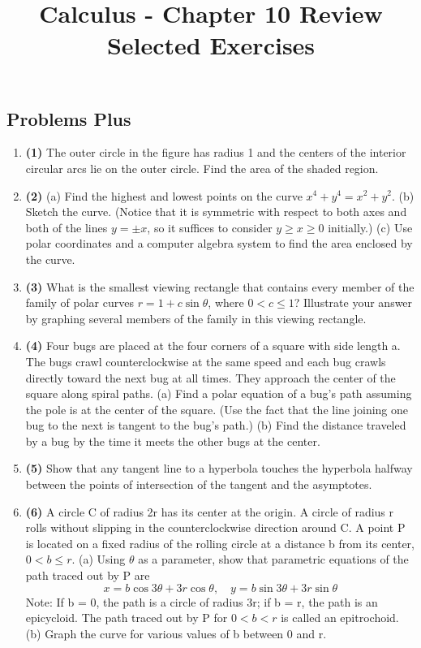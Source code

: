 \documentclass[12pt, a4paper]{article}
\title{Calculus - Chapter 10 Review Selected Exercises}
\author{}
\date{}
\begin{document}
\maketitle
\hrulefill
\vspace{1em}

\subsection*{Problems Plus}
\begin{enumerate}
    \item \textbf{(1)} The outer circle in the figure has radius 1 and the centers of the interior circular arcs lie on the outer circle. Find the area of the shaded region.
    
    \item \textbf{(2)} (a) Find the highest and lowest points on the curve $x^4 + y^4 = x^2 + y^2$.
    (b) Sketch the curve. (Notice that it is symmetric with respect to both axes and both of the lines $y = \pm x$, so it suffices to consider $y \ge x \ge 0$ initially.)
    (c) Use polar coordinates and a computer algebra system to find the area enclosed by the curve.

    \item \textbf{(3)} What is the smallest viewing rectangle that contains every member of the family of polar curves $r = 1 + c \sin \theta$, where $0 < c \le 1$? Illustrate your answer by graphing several members of the family in this viewing rectangle.

    \item \textbf{(4)} Four bugs are placed at the four corners of a square with side length a. The bugs crawl counterclockwise at the same speed and each bug crawls directly toward the next bug at all times. They approach the center of the square along spiral paths.
    (a) Find a polar equation of a bug’s path assuming the pole is at the center of the square. (Use the fact that the line joining one bug to the next is tangent to the bug’s path.)
    (b) Find the distance traveled by a bug by the time it meets the other bugs at the center.

    \item \textbf{(5)} Show that any tangent line to a hyperbola touches the hyperbola halfway between the points of intersection of the tangent and the asymptotes.
    
    \item \textbf{(6)} A circle C of radius 2r has its center at the origin. A circle of radius r rolls without slipping in the counterclockwise direction around C. A point P is located on a fixed radius of the rolling circle at a distance b from its center, $0 < b \le r$.
    (a) Using $\theta$ as a parameter, show that parametric equations of the path traced out by P are
    \[ x = b \cos 3\theta + 3r \cos \theta, \quad y = b \sin 3\theta + 3r \sin \theta \]
    Note: If b = 0, the path is a circle of radius 3r; if b = r, the path is an epicycloid. The path traced out by P for $0 < b < r$ is called an epitrochoid.
    (b) Graph the curve for various values of b between 0 and r.
\end{enumerate}
\end{document}
